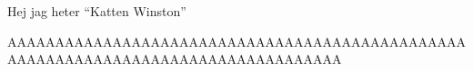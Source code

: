
Hej jag heter “Katten Winston”

AAAAAAAAAAAAAAAAAAAAAAAAAAAAAAAAAAAAAAAAAAAAAAAAAAAAAAAAAAAAAAAAAAAAAAAAAAAAAAAAAAA
